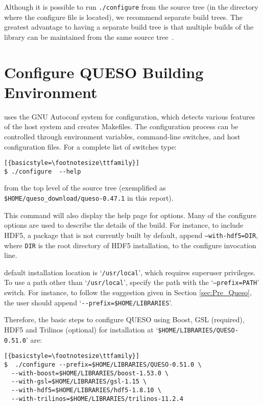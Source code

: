 Although it is possible to run \verb+./configure+ from the source tree (in the directory where the configure file is located), we recommend separate build trees. The greatest advantage to having a separate build tree is that multiple builds of the library
can be maintained from the same source tree~\cite{Trilinos}. 


\section{Configure QUESO Building Environment}\label{sec:Queso_configure}

\Queso{} uses the GNU Autoconf system for configuration, which detects various features of the host system and creates Makefiles. 
The configuration process can be controlled through environment variables, command-line switches, and host configuration files.
For a complete list of switches type:
\begin{lstlisting}[{basicstyle=\footnotesize\ttfamily}]
$ ./configure  --help  
\end{lstlisting}
%
from the top level of the source tree (exemplified as \verb+$HOME/queso_download/queso-0.47.1+ in this report). 

This command will also display the help page for \Queso{} options.  Many of the \Queso{} configure options are used to describe 
the details of the build. For instance, to include HDF5, a package that is not currently built by default, append \texttt{--with-hdf5=DIR}, 
where \texttt{DIR} is the root directory of HDF5 installation,  to the configure invocation line. 

\Queso{} default installation location is `\texttt{/usr/local}', which requires superuser privileges. To use a path
 other than `\texttt{/usr/local}', specify the path with the `\texttt{--prefix=PATH}' switch. For instance, to follow the suggestion
 given in Section \ref{sec:Pre_Queso}, the user should append `\verb+--prefix=$HOME/LIBRARIES+'.



Therefore, the basic steps to configure QUESO using Boost, GSL (required), HDF5 and Trilinos (optional) for installation at `\verb+$HOME/LIBRARIES/QUESO-0.51.0+' are:
\begin{lstlisting}[{basicstyle=\footnotesize\ttfamily}]
$  ./configure --prefix=$HOME/LIBRARIES/QUESO-0.51.0 \
  --with-boost=$HOME/LIBRARIES/boost-1.53.0 \
  --with-gsl=$HOME/LIBRARIES/gsl-1.15 \
  --with-hdf5=$HOME/LIBRARIES/hdf5-1.8.10 \
  --with-trilinos=$HOME/LIBRARIES/trilinos-11.2.4
  \end{lstlisting}

